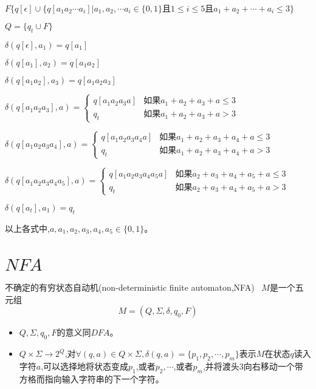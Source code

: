\begin{example}
    $F \{q[\epsilon]\cup\{q[a_1a_2\cdots a_i]|a_1,a_2,\cdots a_i\in\{0,1\}\text{且}1\le i\le 5\text{且}a_1+a_2+\cdots+a_i\le 3\}$
    
    $Q=\{q_t\cup F\}$
    
    $\delta(q[\epsilon],a_1) = q[a_1]$
    
    $\delta(q[a_1],a_2) = q[a_1a_2]$
    
    $\delta(q[a_1a_2],a_3) = q[a_1a_2a_3]$	
    
    $\delta(q[a_1a_2a_3],a) = \begin{cases}
    q[a_1a_2a_3a] &\text{如果$a_1+a_2+a_3+a\le 3$} \\
    q_t &\text{如果$a_1+a_2+a_3+a > 3$}
    \end{cases}$	
    
    $\delta(q[a_1a_2a_3a_4],a) = \begin{cases}
    q[a_1a_2a_3a_4a] &\text{如果$a_1+a_2+a_3+a_4+a\le 3$} \\
    q_t &\text{如果$a_1+a_2+a_3+a_4+a > 3$}
    \end{cases}$
    
    $\delta(q[a_1a_2a_3a_4a_5],a) = \begin{cases}
    q[a_1a_2a_3a_4a_5a] &\text{如果$a_2+a_3+a_4+a_5+a\le 3$} \\
    q_t &\text{如果$a_2+a_3+a_4+a_5+a > 3$}
    \end{cases}$	
    
    $\delta(q[a_t],a_1) = q_t$		
    
    以上各式中,$a,a_1,a_2,a_3,a_4,a_5\in\{0,1\}$。
\end{example}

\section{$NFA$}
\begin{definition}
	不确定的有穷状态自动机(non-deterministic finite automaton,NFA) \
	$M$是一个五元组
	\[M=(Q,\Sigma,\delta,q_0,F)\]
	\begin{itemize}
		\item $Q,\Sigma,q_0,F$的意义同$DFA$。
		\item $Q\times\Sigma\to 2^Q$,对$\forall(q,a)\in Q\times\Sigma,\delta(q,a)=\{p_1,p_2,\cdots,p_m\}$表示$M$在状态$q$读入字符$a$,可以选择地将状态变成$p_1$,或者$p_2,\cdots$,或者$p_m$,并将渡头3向右移动一个带方格而指向输入字符串的下一个字符。
	\end{itemize}
\end{definition}

